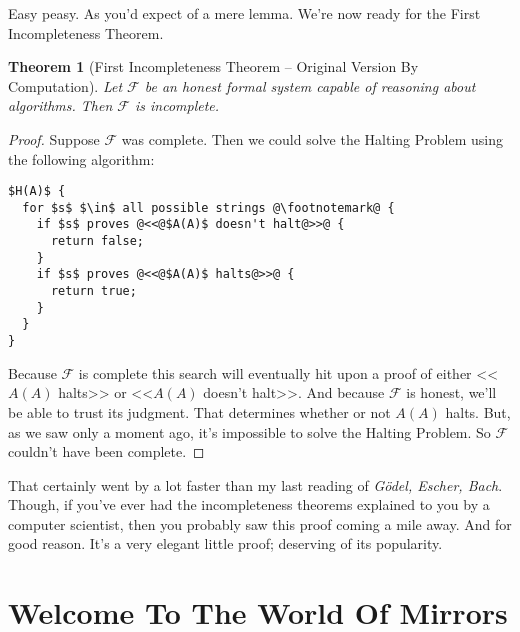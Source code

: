 \documentclass{article}
\theoremstyle{theorem}
\newtheorem{theorem}{Theorem}
\begin{document}
Easy peasy. As you'd expect of a mere lemma. We're now ready for the First Incompleteness Theorem.

\begin{theorem}[First Incompleteness Theorem -- Original Version By Computation]
\label{original-first-by-computation}
Let $\mathcal{F}$ be an honest formal system capable of reasoning about algorithms. Then $\mathcal{F}$ is incomplete.
\end{theorem}

\begin{proof}
Suppose $\mathcal{F}$ was complete. Then we could solve the Halting Problem using the following algorithm:\\[0.5em]
\begin{minipage}{\linewidth}
\begin{lstlisting}
$H(A)$ {
  for $s$ $\in$ all possible strings @\footnotemark@ {
    if $s$ proves @<<@$A(A)$ doesn't halt@>>@ {
      return false;
    }
    if $s$ proves @<<@$A(A)$ halts@>>@ {
      return true;
    }
  }
}
\end{lstlisting}
\end{minipage}
Because $\mathcal{F}$ is complete this search will eventually hit upon a proof of  either <<$A(A)$ halts>> or <<$A(A)$ doesn't halt>>. And because $\mathcal{F}$ is honest, we'll be able to trust its judgment. That determines whether or not $A(A)$ halts. But, as we saw only a moment ago, it's impossible to solve the Halting Problem. So $\mathcal{F}$ couldn't have been complete.
\end{proof}

That certainly went by a lot faster than my last reading of \textit{Gödel, Escher, Bach}. Though, if you've ever had the incompleteness theorems explained to you by a computer scientist, then you probably saw this proof coming a mile away. And for good reason. It's a very elegant little proof; deserving of its popularity.

\section{Welcome To The World Of Mirrors}
\end{document}
